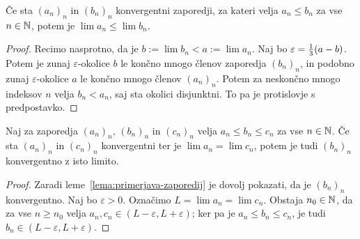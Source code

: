 \begin{lema}
  \label{lema:primerjava-zaporedij}
  Če sta $(a_n)_n$ in $(b_n)_n$ konvergentni zaporedji, za kateri velja $a_n \le
  b_n$ za vse $n \in \mathbb{N}$, potem je $\lim a_n \le \lim b_n$.
\end{lema}

\begin{proof}
  Recimo nasprotno, da je $b := \lim b_n < a := \lim a_n$.
  Naj bo $\varepsilon = \frac{1}{3} (a - b)$.
  Potem je zunaj $\varepsilon$-okolice $b$ le končno mnogo členov zaporedja
  $(b_n)_n$, in podobno zunaj $\varepsilon$-okolice $a$ le končno mnogo členov
  $(a_n)_n$.
  Potem za neskončno mnogo indeksov $n$ velja $b_n < a_n$, saj sta okolici
  disjunktni.
  To pa je protislovje s predpostavko.
\end{proof}

\begin{izrek}
  Naj za zaporedja $(a_n)_n$, $(b_n)_n$ in $(c_n)_n$ velja $a_n \le b_n \le c_n$
  za vse $n \in \mathbb{N}$.
  Če sta $(a_n)_n$ in $(c_n)_n$ konvergentni ter je $\lim a_n = \lim c_n$, potem
  je tudi $(b_n)_n$ konvergentno z isto limito.
\end{izrek}

\begin{proof}
  Zaradi leme~\ref{lema:primerjava-zaporedij} je dovolj pokazati, da je
  $(b_n)_n$ konvergentno.
  Naj bo $\varepsilon > 0$.
  Označimo $L = \lim a_n = \lim c_n$.
  Obstaja $n_0 \in \mathbb{N}$, da za vse $n \ge n_0$ velja $a_n, c_n \in
  (L-\varepsilon,L+\varepsilon)$; ker pa je $a_n \le b_n \le c_n$, je tudi $b_n
  \in (L-\varepsilon, L+\varepsilon)$.
\end{proof}

